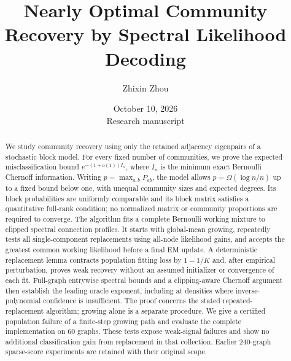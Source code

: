 \documentclass[11pt]{article}
\title{Nearly Optimal Community Recovery by Spectral Likelihood Decoding}
\author{Zhixin Zhou}
\date{October 10, 2026\\\small Research manuscript}
\theoremstyle{definition}
\theoremstyle{remark}
\numberwithin{equation}{section}
\begin{document}
\maketitle
\begin{abstract}
We study community recovery using only the retained adjacency eigenpairs of a stochastic block model. For every fixed number of communities, we prove the expected misclassification bound $e^{-(1+o(1))I_n}$, where $I_n$ is the minimum exact Bernoulli Chernoff information. Writing $p=\max_{a,b}P_{ab}$, the model allows $p=\Omega(\log n/n)$ up to a fixed bound below one, with unequal community sizes and expected degrees. Its block probabilities are uniformly comparable and its block matrix satisfies a quantitative full-rank condition; no normalized matrix or community proportions are required to converge. The algorithm fits a complete Bernoulli working mixture to clipped spectral connection profiles. It starts with global-mean growing, repeatedly tests all single-component replacements using all-node likelihood gains, and accepts the greatest common working likelihood before a final EM update. A deterministic replacement lemma contracts population fitting loss by $1-1/K$ and, after empirical perturbation, proves weak recovery without an assumed initializer or convergence of each fit. Full-graph entrywise spectral bounds and a clipping-aware Chernoff argument then establish the leading oracle exponent, including at densities where inverse-polynomial confidence is insufficient. The proof concerns the stated repeated-replacement algorithm; growing alone is a separate procedure. We give a certified population failure of a finite-step growing path and evaluate the complete implementation on 60 graphs. These tests expose weak-signal failures and show no additional classification gain from replacement in that collection. Earlier 240-graph sparse-score experiments are retained with their original scope.
\end{abstract}





\appendix




\end{document}
